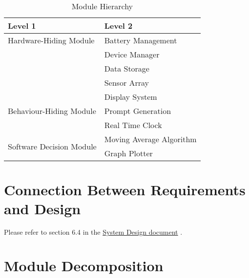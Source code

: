 \documentclass[12pt, titlepage]{article}
\begin{document}
\begin{table}[h!]
  \centering
  \begin{tabular}{p{} p{}}
    \toprule
    \textbf{Level 1}                                      & \textbf{Level 2}         \\
    \midrule

    {Hardware-Hiding Module}                              & Battery Management       \\
                                                          & Device Manager           \\
                                                          & Data Storage             \\
                                                          & Sensor Array             \\

    \midrule

    \multirow{3}{0.3\textwidth}{Behaviour-Hiding Module}  & Display System           \\
                                                          & Prompt Generation        \\
                                                          & Real Time Clock          \\


    \midrule

    \multirow{3}{0.3\textwidth}{Software Decision Module} & Moving Average Algorithm \\
                                                          & Graph Plotter            \\

    \bottomrule
  \end{tabular}
  \caption{Module Hierarchy}
  \label{TblMH}
\end{table}

\section{Connection Between Requirements and Design} \label{SecConnection}

Please refer to section 6.4 in the \href{https://github.com/zakerl/Capstone_Project/blob/main/docs/Design/SystDesign/SystDes.pdf}{System Design document} .

\section{Module Decomposition} \label{SecMD}
\end{document}

